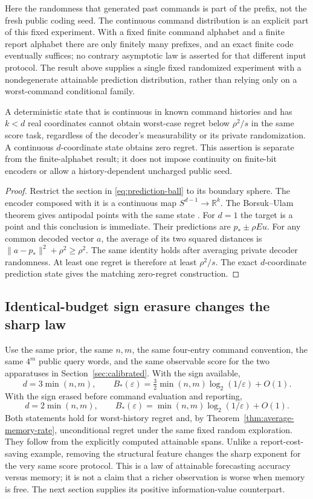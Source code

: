 Here the randomness that generated past commands is part of the prefix,
not the fresh public coding seed. The continuous command distribution is
an explicit part of this fixed experiment. With a fixed finite command
alphabet and a finite report alphabet there are only finitely many
prefixes, and an exact finite code eventually suffices; no contrary
asymptotic law is asserted for that different input protocol. The result
above supplies a single fixed randomized experiment with a nondegenerate
attainable prediction distribution, rather than relying only on a
worst-command conditional family.

\begin{theorem}\label{thm:continuous-regret}
A deterministic state that is continuous in known command histories and
has $k<d$ real coordinates cannot obtain worst-case regret below
$\rho^2/s$ in the same score task, regardless of the decoder's measurability
or its private randomization. A continuous $d$-coordinate state obtains
zero regret. This assertion is separate from the finite-alphabet result;
it does not impose continuity on finite-bit encoders or allow a
history-dependent uncharged public seed.
\end{theorem}
\begin{proof}
Restrict the section in \eqref{eq:prediction-ball} to its boundary sphere.
The encoder composed with it is a continuous map $S^{d-1}\to\mathbb R^k$.
The Borsuk--Ulam theorem gives antipodal points with the same state
\cite{Matousek}. For $d=1$ the target is a point and this conclusion is
immediate. Their predictions are $p_*\pm\rho Eu$. For any common decoded
vector $a$, the average of its two squared distances is
$\|a-p_*\|^2+\rho^2\ge\rho^2$. The same identity holds after averaging
private decoder randomness. At least one regret is therefore at least
$\rho^2/s$. The exact $d$-coordinate prediction state gives the matching
zero-regret construction.
\end{proof}

\subsection{Identical-budget sign erasure changes the sharp law}
Use the same prior, the same $n,m$, the same four-entry command convention,
the same $4^m$ public query words, and the same observable score for the two
apparatuses in Section~\ref{sec:calibrated}. With the sign available,
\[
 d=3\min(n,m),\qquad
 B_*(\varepsilon)=\tfrac32\min(n,m)\log_2(1/\varepsilon)+O(1).
\]
With the sign erased before command evaluation and reporting,
\[
 d=2\min(n,m),\qquad
 B_*(\varepsilon)=\min(n,m)\log_2(1/\varepsilon)+O(1).
\]
Both statements hold for worst-history regret and, by
Theorem~\ref{thm:average-memory-rate}, unconditional regret under the same
fixed random exploration. They follow from the explicitly computed
attainable spans. Unlike a report-cost-saving example, removing the
structural feature changes the sharp exponent for the very same score
protocol. This is a law of attainable forecasting accuracy versus memory;
it is not a claim that a richer observation is worse when memory is free.
The next section supplies its positive information-value counterpart.

